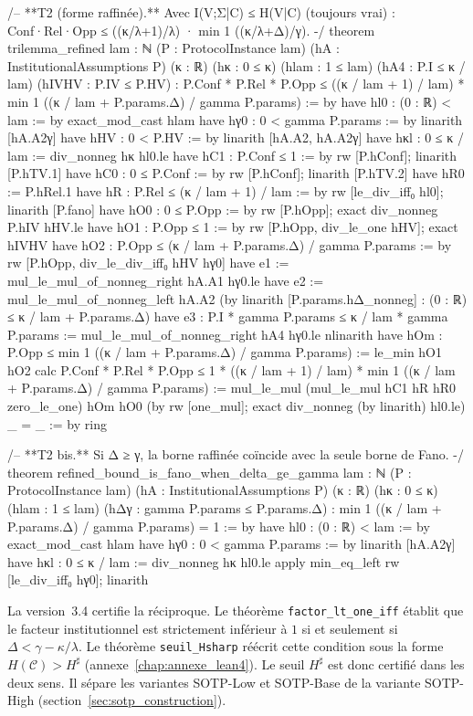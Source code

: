 \begin{sloppypar}
\begin{leancode}[caption={Extensions introduites en version 2.2}, label={lst:lean4_extensions}]
/-- **T2 (forme raffinée).** Avec I(V;Σ|C) ≤ H(V|C) (toujours vrai) :
    Conf·Rel·Opp ≤ ((κ/λ+1)/λ) · min 1 ((κ/λ+Δ)/γ). -/
theorem trilemma_refined {lam : ℕ} (P : ProtocolInstance lam)
    (hA : InstitutionalAssumptions P) (κ : ℝ) (hκ : 0 ≤ κ)
    (hlam : 1 ≤ lam) (hA4 : P.I ≤ κ / lam) (hIVHV : P.IV ≤ P.HV) :
    P.Conf * P.Rel * P.Opp ≤
      ((κ / lam + 1) / lam) * min 1 ((κ / lam + P.params.Δ) / gamma P.params) := by
  have hl0 : (0 : ℝ) < lam := by exact_mod_cast hlam
  have hγ0 : 0 < gamma P.params := by linarith [hA.A2γ]
  have hHV : 0 < P.HV := by linarith [hA.A2, hA.A2γ]
  have hκl : 0 ≤ κ / lam := div_nonneg hκ hl0.le
  have hC1 : P.Conf ≤ 1 := by rw [P.hConf]; linarith [P.hTV.1]
  have hC0 : 0 ≤ P.Conf := by rw [P.hConf]; linarith [P.hTV.2]
  have hR0 := P.hRel.1
  have hR : P.Rel ≤ (κ / lam + 1) / lam := by
    rw [le_div_iff₀ hl0]; linarith [P.fano]
  have hO0 : 0 ≤ P.Opp := by rw [P.hOpp]; exact div_nonneg P.hIV hHV.le
  have hO1 : P.Opp ≤ 1 := by
    rw [P.hOpp, div_le_one hHV]; exact hIVHV
  have hO2 : P.Opp ≤ (κ / lam + P.params.Δ) / gamma P.params := by
    rw [P.hOpp, div_le_div_iff₀ hHV hγ0]
    have e1 := mul_le_mul_of_nonneg_right hA.A1 hγ0.le
    have e2 := mul_le_mul_of_nonneg_left hA.A2
      (by linarith [P.params.hΔ_nonneg] : (0 : ℝ) ≤ κ / lam + P.params.Δ)
    have e3 : P.I * gamma P.params ≤ κ / lam * gamma P.params :=
      mul_le_mul_of_nonneg_right hA4 hγ0.le
    nlinarith
  have hOm : P.Opp ≤ min 1 ((κ / lam + P.params.Δ) / gamma P.params) := le_min hO1 hO2
  calc P.Conf * P.Rel * P.Opp ≤ 1 * ((κ / lam + 1) / lam) * min 1 ((κ / lam + P.params.Δ) / gamma P.params) :=
        mul_le_mul (mul_le_mul hC1 hR hR0 zero_le_one) hOm hO0
          (by rw [one_mul]; exact div_nonneg (by linarith) hl0.le)
    _ = _ := by ring

/-- **T2 bis.** Si Δ ≥ γ, la borne raffinée coïncide avec la seule borne de Fano. -/
theorem refined_bound_is_fano_when_delta_ge_gamma {lam : ℕ} (P : ProtocolInstance lam)
    (hA : InstitutionalAssumptions P) (κ : ℝ) (hκ : 0 ≤ κ) (hlam : 1 ≤ lam)
    (hΔγ : gamma P.params ≤ P.params.Δ) :
    min 1 ((κ / lam + P.params.Δ) / gamma P.params) = 1 := by
  have hl0 : (0 : ℝ) < lam := by exact_mod_cast hlam
  have hγ0 : 0 < gamma P.params := by linarith [hA.A2γ]
  have hκl : 0 ≤ κ / lam := div_nonneg hκ hl0.le
  apply min_eq_left
  rw [le_div_iff₀ hγ0]; linarith
\end{leancode}
La version~3.4 certifie la r\'eciproque. Le th\'eor\`eme \texttt{factor\_lt\_one\_iff} \'etablit que le facteur
institutionnel est strictement inf\'erieur \`a $1$ si et seulement si $\Delta < \gamma - \kappa/\lambda$.
Le th\'eor\`eme \texttt{seuil\_Hsharp} r\'e\'ecrit cette condition sous la forme $H(\mathcal{C}) > H^\sharp$
(annexe~\ref{chap:annexe_lean4}). Le seuil $H^\sharp$ est donc certifi\'e dans les deux sens. Il s\'epare
les variantes SOTP-Low et SOTP-Base de la variante SOTP-High (section~\ref{sec:sotp_construction}).
\end{sloppypar}

